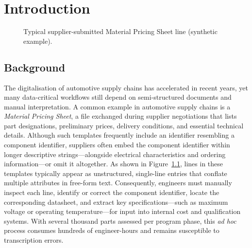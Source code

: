 \chapter{Introduction}\label{chapter:introduction}

\begin{figure}[H]
  \centering
  \caption{Typical supplier-submitted Material Pricing Sheet line (synthetic example).}
  \label{fig:standardised-quotation-analysis-template-line-example}
\end{figure}

\section{Background }
The digitalisation of automotive supply chains has accelerated in recent years, yet many data-critical workflows still depend on semi-structured documents and manual interpretation.  
A common example in automotive supply chains is a \emph{Material Pricing Sheet}, a file exchanged during supplier negotiations that lists part designations, preliminary prices, delivery conditions, and essential technical details.  
Although such templates frequently include an identifier resembling a component identifier, suppliers often embed the component identifier within longer descriptive strings—alongside electrical characteristics and ordering information—or omit it altogether.  
As shown in Figure~\ref{fig:standardised-quotation-analysis-template-line-example}, lines in these templates typically appear as unstructured, single-line entries that conflate multiple attributes in free-form text.  
Consequently, engineers must manually inspect each line, identify or correct the component identifier, locate the corresponding datasheet, and extract key specifications—such as maximum voltage or operating temperature—for input into internal cost and qualification systems.  
With several thousand parts assessed per program phase, this \emph{ad hoc} process consumes hundreds of engineer-hours and remains susceptible to transcription errors.

